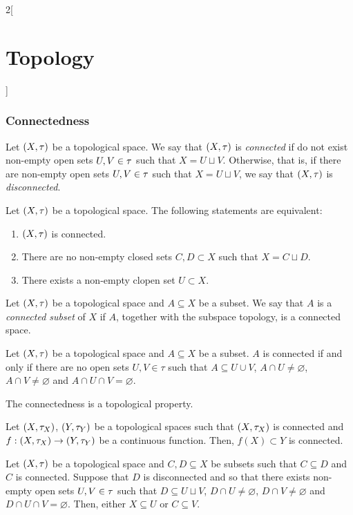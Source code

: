 \documentclass[../../../main.tex]{subfiles}
\begin{document}
\begin{multicols}{2}[\section{Topology}]
    \subsubsection{Connectedness}
    \begin{definition}
        Let $(X,\tau)$ be a topological space. We say that $(X,\tau)$ is \emph{connected} if do not exist non-empty open sets $U,V\in\tau$ such that $X=U\sqcup V$. Otherwise, that is, if there are non-empty open sets $U,V\in\tau$ such that $X=U\sqcup V$, we say that $(X,\tau)$ is \emph{disconnected}.
    \end{definition}
    \begin{prop}
        Let $(X,\tau)$ be a topological space. The following statements are equivalent:
        \begin{enumerate}
            \item $(X,\tau)$ is connected.
            \item There are no non-empty closed sets $C,D\subset X$ such that $X=C\sqcup D$.
            \item There exists a non-empty clopen set $U\subset X$.
        \end{enumerate}
    \end{prop}
    \begin{definition}
        Let $(X,\tau)$ be a topological space and $A\subseteq X$ be a subset. We say that $A$ is a \emph{connected subset} of $X$ if $A$, together with the subspace topology, is a connected space.
    \end{definition}
    \begin{prop}
        Let $(X,\tau)$ be a topological space and $A\subseteq X$ be a subset. $A$ is connected if and only if there are no open sets $U,V\in \tau$ such that $A\subseteq U\cup V$, $A\cap U\ne\varnothing$, $A\cap V\ne\varnothing$ and $A\cap U\cap V=\varnothing$.
    \end{prop}
    \begin{prop}
        The connectedness is a topological property.
    \end{prop}
    \begin{theorem}
        Let $(X,\tau_X)$, $(Y,\tau_Y)$ be a topological spaces such that $(X,\tau_X)$ is connected and $f:(X,\tau_X)\rightarrow(Y,\tau_Y)$ be a continuous function. Then, $f(X)\subset Y$ is connected.
    \end{theorem}
    \begin{lemma}
        Let $(X,\tau)$ be a topological space and $C,D\subseteq X$ be subsets such that $C\subseteq D$ and $C$ is connected. Suppose that $D$ is disconnected and so that there exists non-empty open sets $U,V\in\tau$ such that $D\subseteq U\sqcup V$, $D\cap U\ne\varnothing$, $D\cap V\ne\varnothing$ and $D\cap U\cap V=\varnothing$. Then, either $X\subseteq U$ or $C\subseteq V$.

\end{lemma}
\end{multicols}
\end{document}
